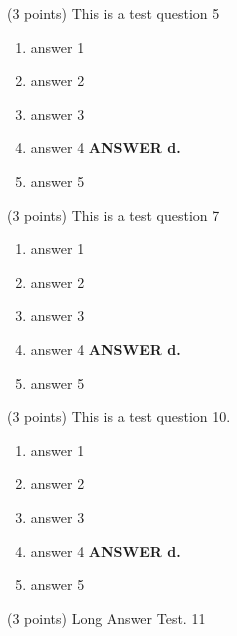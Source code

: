 \documentclass{article}
\newcommand{\ans}[1]{ \ifnum\showans=1 {\bf ANSWER #1.} \fi }
\begin{document}

\item (3 points) This is a test question 5
  \begin{enumerate}
  \item answer 1
  \item answer 2
  \item answer 3
  \item answer 4  \ans{d}
  \item answer 5
  \end{enumerate}

\item (3 points) This is a test question 7
  \begin{enumerate}
  \item answer 1
  \item answer 2
  \item answer 3
  \item answer 4  \ans{d}
  \item answer 5
  \end{enumerate}

\item (3 points) This is a test question 10.
  \begin{enumerate}
  \item answer 1
  \item answer 2
  \item answer 3
  \item answer 4  \ans{d}
  \item answer 5
  \end{enumerate}

\item (3 points) Long Answer Test. 11
\end{document}
